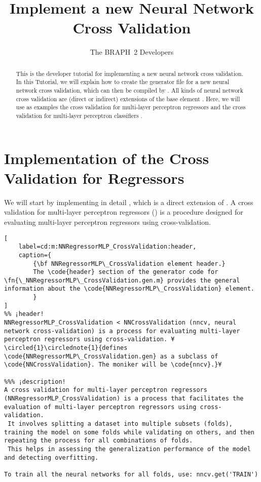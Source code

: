 \documentclass{tufte-handout}
\title{Implement a new Neural Network Cross Validation}
\author[The BRAPH~2 Developers]{The BRAPH~2 Developers}
\begin{document}
\maketitle

\begin{abstract}
\noindent
This is the developer tutorial for implementing a new neural network cross validation. 
In this Tutorial, we will explain how to create the generator file  for a new neural network cross validation, which can then be compiled by . All kinds of neural network cross validation are (direct or indirect) extensions of the base element . Here, we will use as examples the cross validation for multi-layer perceptron regressors  and  the cross validation for multi-layer perceptron classifiers .
\end{abstract}

\tableofcontents

\clearpage
\section{Implementation of the Cross Validation for Regressors}

We will start by implementing in detail , which is a direct extension of .
A cross validation for multi-layer perceptron regressors () is a procedure designed for evaluating multi-layer perceptron regressors using cross-validation. 

\begin{lstlisting}[
	label=cd:m:NNRegressorMLP_CrossValidation:header,
	caption={
		{\bf NNRegressorMLP\_CrossValidation element header.}
		The \code{header} section of the generator code for \fn{\_NNRegressorMLP\_CrossValidation.gen.m} provides the general information about the \code{NNRegressorMLP\_CrossValidation} element.
		}
]
%% ¡header!
NNRegressorMLP_CrossValidation < NNCrossValidation (nncv, neural network cross-validation) is a process for evaluating multi-layer perceptron regressors using cross-validation. ¥\circled{1}\circlednote{1}{defines \code{NNRegressorMLP\_CrossValidation.gen} as a subclass of \code{NNCrossValidation}. The moniker will be \code{nncv}.}¥

%%% ¡description!
A cross validation for multi-layer perceptron regressors (NNRegressorMLP_CrossValidation) is a process that facilitates the evaluation of multi-layer perceptron regressors using cross-validation. 
 It involves splitting a dataset into multiple subsets (folds), training the model on some folds while validating on others, and then repeating the process for all combinations of folds. 
 This helps in assessing the generalization performance of the model and detecting overfitting.

To train all the neural networks for all folds, use: nncv.get('TRAIN')

\end{lstlisting}
\end{document}
